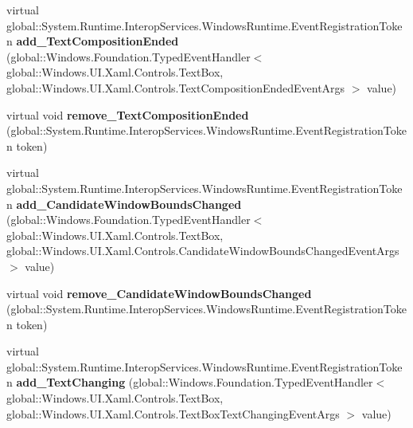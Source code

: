 \begin{DoxyCompactItemize}
\item 
\mbox{\label{class_windows_1_1_u_i_1_1_xaml_1_1_controls_1_1_text_box_a1ec5fb1c372d817e2d83ca0f4160361d}} 
virtual global\+::\+System.\+Runtime.\+Interop\+Services.\+Windows\+Runtime.\+Event\+Registration\+Token {\bfseries add\+\_\+\+Text\+Composition\+Ended} (global\+::\+Windows.\+Foundation.\+Typed\+Event\+Handler$<$ global\+::\+Windows.\+U\+I.\+Xaml.\+Controls.\+Text\+Box, global\+::\+Windows.\+U\+I.\+Xaml.\+Controls.\+Text\+Composition\+Ended\+Event\+Args $>$ value)
\item 
\mbox{\label{class_windows_1_1_u_i_1_1_xaml_1_1_controls_1_1_text_box_a5973df0b80c264046f580c78b04aeb61}} 
virtual void {\bfseries remove\+\_\+\+Text\+Composition\+Ended} (global\+::\+System.\+Runtime.\+Interop\+Services.\+Windows\+Runtime.\+Event\+Registration\+Token token)
\item 
\mbox{\label{class_windows_1_1_u_i_1_1_xaml_1_1_controls_1_1_text_box_a0f417de69db14b9dda18a6b486367ec7}} 
virtual global\+::\+System.\+Runtime.\+Interop\+Services.\+Windows\+Runtime.\+Event\+Registration\+Token {\bfseries add\+\_\+\+Candidate\+Window\+Bounds\+Changed} (global\+::\+Windows.\+Foundation.\+Typed\+Event\+Handler$<$ global\+::\+Windows.\+U\+I.\+Xaml.\+Controls.\+Text\+Box, global\+::\+Windows.\+U\+I.\+Xaml.\+Controls.\+Candidate\+Window\+Bounds\+Changed\+Event\+Args $>$ value)
\item 
\mbox{\label{class_windows_1_1_u_i_1_1_xaml_1_1_controls_1_1_text_box_a69264830074f27caa404569cb91f24af}} 
virtual void {\bfseries remove\+\_\+\+Candidate\+Window\+Bounds\+Changed} (global\+::\+System.\+Runtime.\+Interop\+Services.\+Windows\+Runtime.\+Event\+Registration\+Token token)
\item 
\mbox{\label{class_windows_1_1_u_i_1_1_xaml_1_1_controls_1_1_text_box_acb77f51967d36ae23348c70a69fb0313}} 
virtual global\+::\+System.\+Runtime.\+Interop\+Services.\+Windows\+Runtime.\+Event\+Registration\+Token {\bfseries add\+\_\+\+Text\+Changing} (global\+::\+Windows.\+Foundation.\+Typed\+Event\+Handler$<$ global\+::\+Windows.\+U\+I.\+Xaml.\+Controls.\+Text\+Box, global\+::\+Windows.\+U\+I.\+Xaml.\+Controls.\+Text\+Box\+Text\+Changing\+Event\+Args $>$ value)

\end{DoxyCompactItemize}
